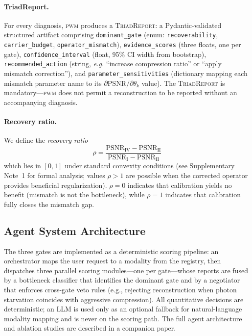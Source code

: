 \documentclass[11pt]{article}
\newcommand{\pwm}{\textsc{pwm}}
\newcommand{\eg}{\textit{e.g.}}
\newcommand{\psnr}{\mathrm{PSNR}}
\newcommand{\recoveryratio}{\rho}
\newcommand{\triadreport}{\textsc{Triad\-Report}}
\begin{document}
\paragraph{TriadReport.}
For every diagnosis, \pwm{} produces a \triadreport{}: a Pydantic-validated
structured artifact comprising
\texttt{dominant\_gate} (enum: \texttt{recoverability},
\texttt{carrier\_budget}, \texttt{operator\_mismatch}),
\texttt{evidence\_scores} (three floats, one per gate),
\texttt{confidence\_interval} (float, 95\% CI width from bootstrap),
\texttt{recommended\_action} (string, \eg{} ``increase compression ratio''
or ``apply mismatch correction''), and
\texttt{parameter\_sensitivities} (dictionary mapping each mismatch
parameter name to its $\partial \psnr / \partial \theta_k$ value).
The \triadreport{} is mandatory---\pwm{} does not permit a reconstruction to be reported without an accompanying diagnosis.

\paragraph{Recovery ratio.}
We define the \emph{recovery ratio}
\begin{equation}
  \recoveryratio = \frac{\psnr_{\text{IV}} - \psnr_{\text{II}}}
                        {\psnr_{\text{I}} - \psnr_{\text{II}}}
  \label{eq:recovery_ratio}
\end{equation}
which lies in $[0, 1]$ under standard convexity conditions (see Supplementary Note~1 for formal analysis; values $\recoveryratio > 1$ are possible when the corrected operator provides beneficial regularization).
$\recoveryratio = 0$ indicates that calibration yields no benefit (mismatch
is not the bottleneck), while $\recoveryratio = 1$ indicates that
calibration fully closes the mismatch gap.


\subsection*{Agent System Architecture}
\label{sec:methods:agents}

The three gates are implemented as a deterministic scoring pipeline:
an orchestrator maps the user request to a modality from the registry,
then dispatches three parallel scoring modules---one per gate---whose
reports are fused by a bottleneck classifier that identifies the dominant
gate and by a negotiator that enforces cross-gate veto rules
(e.g., rejecting reconstruction when photon starvation coincides with
aggressive compression).  All quantitative decisions are deterministic;
an LLM is used only as an optional fallback for natural-language modality
mapping and is never on the scoring path.  The full agent architecture
and ablation studies are described in a companion paper.
\end{document}
